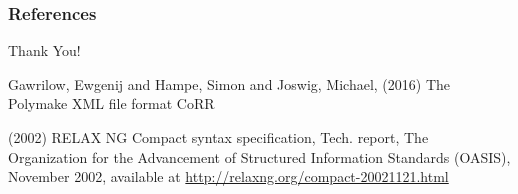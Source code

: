 \documentclass[9pt]{beamer}
\theoremstyle{definition}
\begin{document}


\begin{frame}[fragile]{}
  \frametitle{References}
  \begin{center}
    Thank You!
  \end{center}

  \footnotesize{
    \begin{thebibliography}{99} %
     Gawrilow, Ewgenij and Hampe, Simon and Joswig, Michael, (2016)
    \newblock The Polymake XML file format
    \newblock CoRR 

   (2002)
    \newblock RELAX NG Compact syntax specification,
    \newblock Tech. report, The Organization for the Advancement of Structured Information Standards (OASIS), November 2002,
    \newblock available at \url{http://relaxng.org/compact-20021121.html}
    
    \end{thebibliography}
  }
\end{frame}

\end{document}
